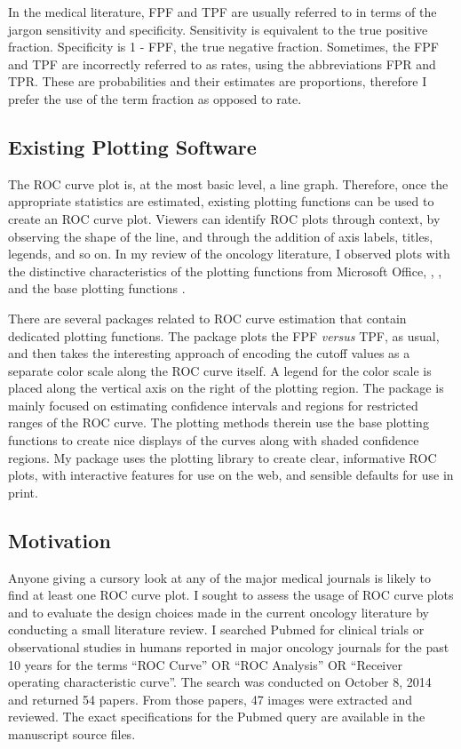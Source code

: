\documentclass[article]{jss}
\begin{document}
In the medical literature, FPF and TPF are usually referred to in terms
of the jargon sensitivity and specificity. Sensitivity is equivalent to
the true positive fraction. Specificity is 1 - FPF, the true negative
fraction. Sometimes, the FPF and TPF are incorrectly referred to as
rates, using the abbreviations FPR and TPR. These are probabilities and
their estimates are proportions, therefore I prefer the use of the term
fraction as opposed to rate.

\subsection{Existing Plotting
Software}\label{existing-plotting-software}

The ROC curve plot is, at the most basic level, a line graph. Therefore,
once the appropriate statistics are estimated, existing plotting
functions can be used to create an ROC curve plot. Viewers can identify
ROC plots through context, by observing the shape of the line, and
through the addition of axis labels, titles, legends, and so on. In my
review of the oncology literature, I observed plots with the distinctive
characteristics of the plotting functions from Microsoft Office,
, , and the base  plotting
functions \citep{arr}.

There are several  packages related to ROC curve estimation
that contain dedicated plotting functions. The  package
\citep{rocr} plots the FPF \emph{versus} TPF, as usual, and then takes
the interesting approach of encoding the cutoff values as a separate
color scale along the ROC curve itself. A legend for the color scale is
placed along the vertical axis on the right of the plotting region. The
 package \citep{pROC} is mainly focused on estimating
confidence intervals and regions for restricted ranges of the ROC curve.
The plotting methods therein use the base  plotting
functions to create nice displays of the curves along with shaded
confidence regions. My  package uses the 
\citep{ggplot2} plotting library to create clear, informative ROC plots,
with interactive features for use on the web, and sensible defaults for
use in print.

\subsection{Motivation}\label{motivation}

Anyone giving a cursory look at any of the major medical journals is
likely to find at least one ROC curve plot. I sought to assess the usage
of ROC curve plots and to evaluate the design choices made in the
current oncology literature by conducting a small literature review. I
searched Pubmed for clinical trials or observational studies in humans
reported in major oncology journals for the past 10 years for the terms
``ROC Curve'' OR ``ROC Analysis'' OR ``Receiver operating characteristic
curve''. The search was conducted on October 8, 2014 and returned 54
papers. From those papers, 47 images were extracted and reviewed. The
exact specifications for the Pubmed query are available in the
manuscript source files.
\end{document}
